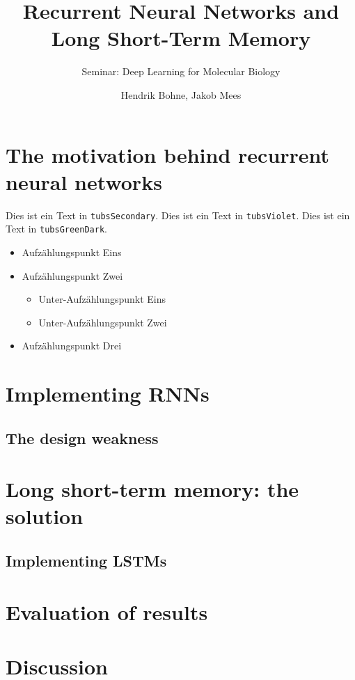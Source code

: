 \documentclass[%
  a4paper,%
  12pt,%
  blue,%
  ]{tubsartcl}
\title{Recurrent Neural Networks and Long Short-Term Memory}
\subtitle{Seminar: Deep Learning for Molecular Biology}
\author{Hendrik Bohne, Jakob Mees}
\begin{document}
\maketitle%

\tableofcontents

\section{The motivation behind recurrent neural networks}

\textcolor{tubsSecondary}{Dies ist ein Text in \texttt{tubsSecondary}.}
\textcolor{tubsViolet}{Dies ist ein Text in \texttt{tubsViolet}.}
\textcolor{tubsGreenDark}{Dies ist ein Text in \texttt{tubsGreenDark}.}\bigskip

\lipsum[1]

\begin{itemize}
  \item Aufzählungspunkt Eins
  \item Aufzählungspunkt Zwei
    \begin{itemize}
      \item Unter-Aufzählungspunkt Eins
      \item Unter-Aufzählungspunkt Zwei
    \end{itemize}
  \item Aufzählungspunkt Drei
\end{itemize}

\section{Implementing RNNs}

\lipsum[2-5]

\subsection{The design weakness}

\lipsum[4-7]

\section{Long short-term memory: the solution}

\lipsum[1-3]

\subsection{Implementing LSTMs}

\lipsum[4-7]

\section{Evaluation of results}

\lipsum[1-3]

\section{Discussion}

\lipsum[1-3]
\end{document}
